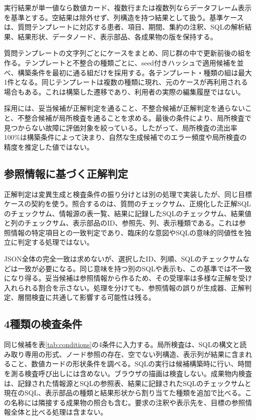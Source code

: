 \documentclass[manuscript,review,anonymous]{acmart}
\newcommand{\condition}[1]{\textsf{#1}}
\begin{document}
実行結果が単一値なら数値カード、複数行または複数列ならデータフレーム表示を基準とする。空結果は除外せず、列構造を持つ結果として扱う。基準ケースは、質問テンプレートに対応する患者、項目、期間、集約の注釈、SQLの解析結果、結果形状、データノード、表示部品、各成果物の版を保持する。

質問テンプレートの文字列ごとにケースをまとめ、同じ群の中で更新前後の組を作る。テンプレートと不整合の種類ごとに、seed付きハッシュで適用候補を並べ、構築条件を最初に通る組だけを採用する。各テンプレート・種類の組は最大1件となる。同じテンプレートは複数の種類に現れ、元のケースが再利用される場合もある。これは構築した遷移であり、利用者の実際の編集履歴ではない。

採用には、妥当候補が正解判定を通ること、不整合候補が正解判定を通らないこと、不整合候補が局所検査を通ることを求める。最後の条件により、局所検査で見つからない故障に評価対象を絞っている。したがって、局所検査の流出率100\%は構築条件によって決まり、自然な生成候補でのエラー頻度や局所検査の精度を推定した値ではない。

\subsection{参照情報に基づく正解判定}

正解判定は変異生成と検査条件の振り分けとは別の処理で実装したが、同じ目標ケースの契約を使う。照合するのは、質問のチェックサム、正規化した正解SQLのチェックサム、情報源の表一覧、結果に記録したSQLのチェックサム、結果値と列のチェックサム、表示部品のID、参照先、列、表示種類である。これは参照情報の特定項目との一致判定であり、臨床的な意図やSQLの意味的同値性を独立に判定する処理ではない。

JSON全体の完全一致は求めないが、選択したID、列順、SQLのチェックサムなどは一致が必要になる。同じ意味を持つ別のSQLや表示も、この基準では不一致になり得る。妥当候補は参照情報から作るため、その受理率は多様な正解を受け入れられる割合を示さない。処理を分けても、参照情報の誤りが生成器、正解判定、層間検査に共通して影響する可能性は残る。

\subsection{4種類の検査条件}

同じ候補を表\ref{tab:conditions}の4条件に入力する。\condition{局所検査}は、SQLの構文と読み取り専用の形式、ノード参照の存在、空でない列構造、表示列が結果に含まれること、数値カードの形状条件を調べる。SQLの実行は候補構築時に行い、時間を測る検査呼び出しには含めない。ブラウザの描画は検査しない。\condition{成果物内検査}は、記録された情報源とSQLの参照表、結果に記録されたSQLのチェックサムと現在のSQL、表示部品の種類と結果形状から割り当てた種類を追加で比べる。この名称には隣接する成果物の照合も含む。要求の注釈や表示先を、目標の参照情報全体と比べる処理は含まない。
\end{document}

